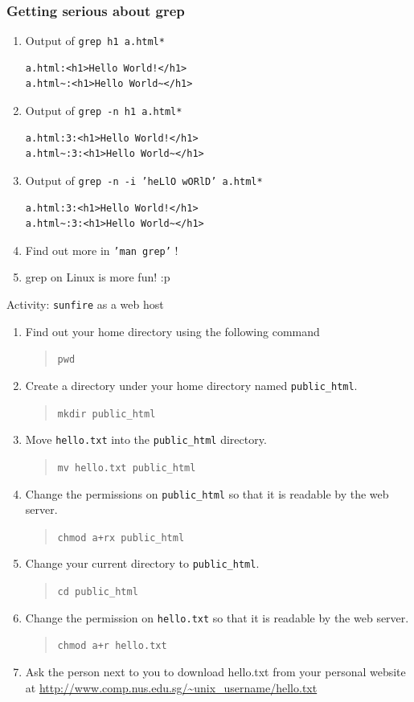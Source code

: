 \documentclass[a4paper]{beamer}
\newcommand{\ftitle}[1]{\frametitle<presentation>{#1}}
\newcommand{\cmd}[1]{\begin{quote}{\tt #1}\end{quote}}
\begin{document}
\begin{frame}[fragile]
\ftitle{Getting serious about grep}
\begin{enumerate}

\item Output of \texttt{grep h1 a.html*}

\begin{verbatim}
a.html:<h1>Hello World!</h1>
a.html~:<h1>Hello World~</h1>
\end{verbatim}

\pause
\item Output of \texttt{grep -n h1 a.html*}
\begin{verbatim}
a.html:3:<h1>Hello World!</h1>
a.html~:3:<h1>Hello World~</h1>
\end{verbatim}

\pause
\item Output of \texttt{grep -n -i 'heLlO wORlD' a.html*}
\begin{verbatim}
a.html:3:<h1>Hello World!</h1>
a.html~:3:<h1>Hello World~</h1>
\end{verbatim}

\pause
\item Find out more in \texttt{'man grep'} !
\pause
\item grep on Linux is more fun! :p
\end{enumerate}
\end{frame}





\begin{frame}[allowframebreaks=0.6]{Activity: \texttt{sunfire} as a web host}
\begin{enumerate}
\item Find out your home directory using the following command
\cmd{pwd}
\item Create a directory under your home directory named
\texttt{public\_html}. \cmd{mkdir public\_html}
\item Move \texttt{hello.txt} into the \texttt{public\_html} directory. \cmd{mv hello.txt public\_html}
\item Change the permissions on \texttt{public\_html} so that it is readable by
the web server. \cmd{chmod a+rx public\_html}
\item Change your current directory to \texttt{public\_html}. \cmd{cd public\_html}
\item Change the permission on \texttt{hello.txt} so that it is readable by the
web server.  \cmd{chmod a+r hello.txt}
\item Ask the person next to you to download hello.txt from your personal
website at \url{http://www.comp.nus.edu.sg/~unix_username/hello.txt}
\end{enumerate}
\end{frame}
\end{document}
